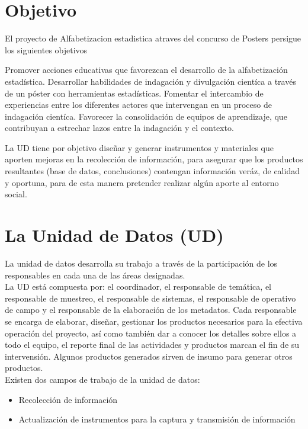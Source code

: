 \documentclass{article}
\begin{document}
\section{Objetivo}
El proyecto de Alfabetizacion estadistica atraves del concurso de Posters persigue los siguientes objetivos 

Promover acciones educativas que favorezcan el desarrollo de la
alfabetización estadística.
Desarrollar habilidades de indagación y divulgación cientíca a través de un póster con herramientas estadísticas.
Fomentar el intercambio de experiencias entre los diferentes actores que intervengan en un proceso de indagación cientíca.
Favorecer la consolidación de equipos de aprendizaje, que contribuyan a estrechar lazos entre la indagación y el contexto.




La UD tiene por objetivo diseñar y generar instrumentos y materiales que aporten mejoras en la recolección de información, para asegurar que los productos resultantes (base de datos, conclusiones) contengan información veráz, de calidad y oportuna, para de esta manera pretender realizar algún aporte al entorno social.
\section{La Unidad de Datos (UD)}


La unidad de datos desarrolla su trabajo a través de la participación de los responsables en cada una de las áreas designadas.\\

La UD está compuesta por: el coordinador, el responsable de temática, el responsable de muestreo, el responsable de sistemas, el responsable de operativo de campo y el responsable de la elaboración de los metadatos. Cada responsable se encarga de elaborar, diseñar, gestionar los productos necesarios para la efectiva operación del proyecto,  así como también dar a conocer los detalles sobre ellos a todo el equipo, el reporte final de las actividades y productos  marcan el fin de su intervensión. Algunos productos generados  sirven de insumo para generar otros productos.\\

Existen dos campos de trabajo de la unidad de datos:

\begin{itemize}
\item Recolección de información 
\item Actualización de instrumentos para la captura y transmisión de información
\end{itemize}
\end{document}
